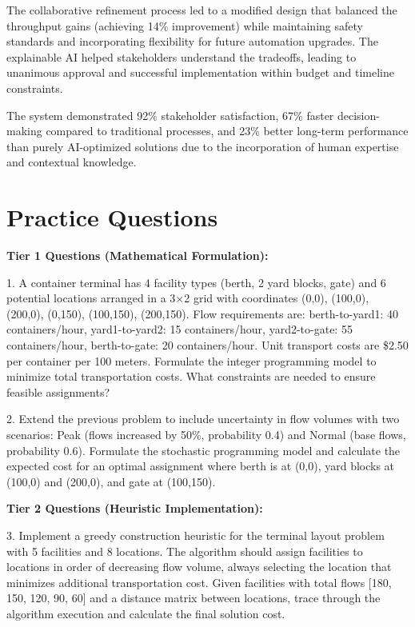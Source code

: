 \documentclass{article}
\begin{document}
The collaborative refinement process led to a modified design that balanced the throughput gains (achieving 14\% improvement) while maintaining safety standards and incorporating flexibility for future automation upgrades. The explainable AI helped stakeholders understand the tradeoffs, leading to unanimous approval and successful implementation within budget and timeline constraints.

The system demonstrated 92\% stakeholder satisfaction, 67\% faster decision-making compared to traditional processes, and 23\% better long-term performance than purely AI-optimized solutions due to the incorporation of human expertise and contextual knowledge.

\section{Practice Questions}

\textbf{Tier 1 Questions (Mathematical Formulation):}

1. A container terminal has 4 facility types (berth, 2 yard blocks, gate) and 6 potential locations arranged in a 3×2 grid with coordinates (0,0), (100,0), (200,0), (0,150), (100,150), (200,150). Flow requirements are: berth-to-yard1: 40 containers/hour, yard1-to-yard2: 15 containers/hour, yard2-to-gate: 55 containers/hour, berth-to-gate: 20 containers/hour. Unit transport costs are \$2.50 per container per 100 meters. Formulate the integer programming model to minimize total transportation costs. What constraints are needed to ensure feasible assignments?

2. Extend the previous problem to include uncertainty in flow volumes with two scenarios: Peak (flows increased by 50\%, probability 0.4) and Normal (base flows, probability 0.6). Formulate the stochastic programming model and calculate the expected cost for an optimal assignment where berth is at (0,0), yard blocks at (100,0) and (200,0), and gate at (100,150).

\textbf{Tier 2 Questions (Heuristic Implementation):}

3. Implement a greedy construction heuristic for the terminal layout problem with 5 facilities and 8 locations. The algorithm should assign facilities to locations in order of decreasing flow volume, always selecting the location that minimizes additional transportation cost. Given facilities with total flows [180, 150, 120, 90, 60] and a distance matrix between locations, trace through the algorithm execution and calculate the final solution cost.
\end{document}
